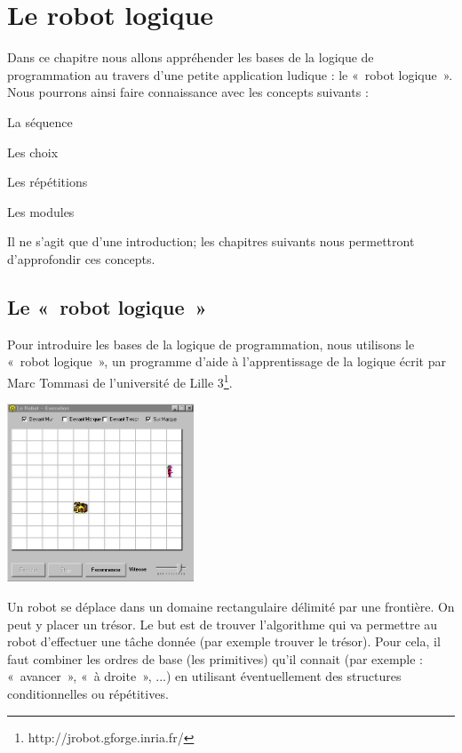 \chapter{Le robot logique}

	Dans ce chapitre nous allons appréhender les bases de la logique de
	programmation au travers d'une petite application
	ludique : le «~robot logique~». Nous pourrons ainsi faire connaissance
	avec les concepts suivants :
	
	\begin{liste}
	\item La séquence
	\item Les choix
	\item Les répétitions
	\item Les modules
	\end{liste}

	Il ne s'agit que d'une introduction;
	les chapitres suivants nous permettront d'approfondir
	ces concepts.

\section{Le «~robot logique~»}

	Pour introduire les bases de la logique de programmation, nous utilisons
	le «~robot logique~», un programme d'aide à
	l'apprentissage de la logique écrit par Marc Tommasi
	de l'université de Lille
	3\footnote{http://jrobot.gforge.inria.fr/}.
	
	\begin{center}
	\includegraphics[width=5.553cm,height=5.302cm]{image/robot-grille}
	\end{center}
	
	Un robot se déplace dans un domaine rectangulaire délimité par une
	frontière. On peut y placer un trésor. Le but est de trouver
	l'algorithme qui va permettre au robot
	d'effectuer une tâche donnée (par exemple trouver le
	trésor). Pour cela, il faut combiner les ordres de base (les
	primitives) qu'il connait (par exemple : «~avancer~»,
	«~à droite~», ...) en utilisant éventuellement des structures
	conditionnelles ou répétitives.

